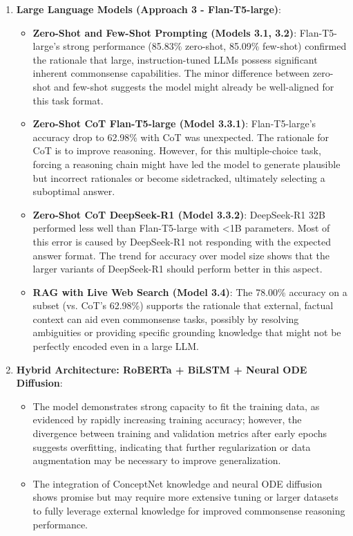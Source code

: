 \documentclass[10.5pt]{article}
\begin{document}
\begin{enumerate}
    \item \textbf{Large Language Models (Approach 3 - Flan-T5-large)}:
        \begin{itemize}
            \item \textbf{Zero-Shot and Few-Shot Prompting (Models 3.1, 3.2)}: Flan-T5-large's strong performance (85.83\% zero-shot, 85.09\% few-shot) confirmed the rationale that large, instruction-tuned LLMs possess significant inherent commonsense capabilities. The minor difference between zero-shot and few-shot suggests the model might already be well-aligned for this task format.
            \item \textbf{Zero-Shot CoT Flan-T5-large (Model 3.3.1)}: Flan-T5-large's accuracy drop to 62.98\% with CoT was unexpected. The rationale for CoT is to improve reasoning. However, for this multiple-choice task, forcing a reasoning chain might have led the model to generate plausible but incorrect rationales or become sidetracked, ultimately selecting a suboptimal answer.
            \item \textbf{Zero-Shot CoT DeepSeek-R1 (Model 3.3.2)}:  DeepSeek-R1 32B performed less well than Flan-T5-large with <1B parameters. Most of this error is caused by  DeepSeek-R1 not responding with the expected answer format. The trend for accuracy over model size shows that the larger variants of DeepSeek-R1 should perform better in this aspect.
            \item \textbf{RAG with Live Web Search (Model 3.4)}: The 78.00\% accuracy on a subset (vs. CoT's 62.98\%) supports the rationale that external, factual context can aid even commonsense tasks, possibly by resolving ambiguities or providing specific grounding knowledge that might not be perfectly encoded even in a large LLM.
        \end{itemize}


    \item \textbf{Hybrid Architecture: RoBERTa + BiLSTM + Neural ODE Diffusion}:
    \begin{itemize}
        \item The model demonstrates strong capacity to fit the training data, as evidenced by rapidly increasing training accuracy; however, the divergence between training and validation metrics after early epochs suggests overfitting, indicating that further regularization or data augmentation may be necessary to improve generalization.
        \item The integration of ConceptNet knowledge and neural ODE diffusion shows promise but may require more extensive tuning or larger datasets to fully leverage external knowledge for improved commonsense reasoning performance.
    \end{itemize}


\end{enumerate}
\end{document}
